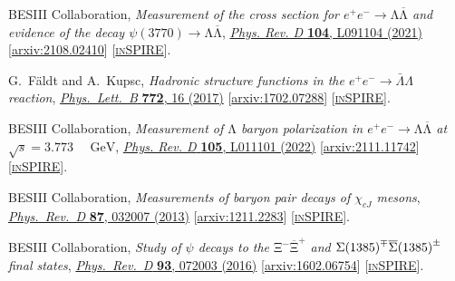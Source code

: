 \documentclass[a4paper,11pt]{article}
\begin{document}
\begin{thebibliography}{**}
 BESIII Collaboration,
\textit{Measurement of the cross section for ${e}^{+}{e}^{\ensuremath{-}}\ensuremath{\rightarrow}\mathrm{\ensuremath{\Lambda}}\overline{\mathrm{\ensuremath{\Lambda}}}$ and evidence of the decay $\ensuremath{\psi}(3770)\ensuremath{\rightarrow}\mathrm{\ensuremath{\Lambda}}\overline{\mathrm{\ensuremath{\Lambda}}}$},
\href{https://journals.aps.org/prd/abstract/10.1103/PhysRevD.104.L091104}{\textit{Phys. Rev. D} \textbf{104}, L091104 (2021)}
[\textcolor{blue}{\href{https://arxiv.org/pdf/2108.02410.pdf}{arxiv:2108.02410}}] 
[\textcolor{blue}{\href{https://inspirehep.net/literature/1900124}{\textsc{inSPIRE}}}].

 G.~F\"aldt and A.~Kupsc,
\textit{Hadronic structure functions in the $e^+ e^- \rightarrow \bar{\Lambda} \Lambda$ reaction}, \href{https://www.sciencedirect.com/science/article/pii/S0370269317304719?via%3Dihub}{\textit{Phys.\ Lett.\ B} {\bf 772}, 16 (2017)} 
[\textcolor{blue}{\href{https://arxiv.org/pdf/1702.07288.pdf}{arxiv:1702.07288}}] 
[\textcolor{blue}{\href{https://inspirehep.net/literature/1514910}{\textsc{inSPIRE}}}].

BESIII Collaboration,
\textit{Measurement of $\mathrm{\ensuremath{\Lambda}}$ baryon polarization in ${e}^{+}{e}^{\ensuremath{-}}\ensuremath{\rightarrow}\mathrm{\ensuremath{\Lambda}}\overline{\mathrm{\ensuremath{\Lambda}}}$ at $\sqrt{s}=3.773\text{ }\text{ }\mathrm{GeV}$},
\href{https://journals.aps.org/prd/abstract/10.1103/PhysRevD.105.L011101}{\textit{Phys. Rev. D} \textbf{105}, L011101 (2022)}
[\textcolor{blue}{\href{https://arxiv.org/pdf/2111.11742.pdf}{arxiv:2111.11742}}] 
[\textcolor{blue}{\href{https://inspirehep.net/literature/1974025}{\textsc{inSPIRE}}}].
  
 BESIII Collaboration, 
\textit{Measurements of baryon pair decays of ${\ensuremath{\chi}}_{cJ}$ mesons},
\href{http://journals.aps.org/prd/abstract/10.1103/PhysRevD.87.032007}{\textit{Phys.\ Rev.\ D} {\bf 87}, 032007 (2013)}
[\textcolor{blue}{\href{https://arxiv.org/pdf/1211.2283.pdf}{arxiv:1211.2283}}] 
[\textcolor{blue}{\href{https://inspirehep.net/literature/1202270}{\textsc{inSPIRE}}}].

 BESIII Collaboration, 
\textit{Study of $\ensuremath{\psi}$ decays to the ${\mathrm{\ensuremath{\Xi}}}^{\ensuremath{-}}{\overline{\mathrm{\ensuremath{\Xi}}}}^{+}$ and $\mathrm{\ensuremath{\Sigma}}(1385{)}^{\ensuremath{\mp}}\overline{\mathrm{\ensuremath{\Sigma}}}(1385{)}^{\ifmmode\pm\else\textpm\fi{}}$ final states},
\href{http://journals.aps.org/prd/abstract/10.1103/PhysRevD.93.072003}{\textit{Phys.\ Rev.\ D} {\bf 93}, 072003 (2016)}
[\textcolor{blue}{\href{https://arxiv.org/pdf/1602.06754.pdf}{arxiv:1602.06754}}] 
[\textcolor{blue}{\href{https://inspirehep.net/literature/1422780}{\textsc{inSPIRE}}}].


\end{thebibliography}
\end{document}
